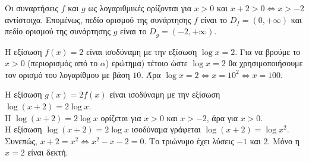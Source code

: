 \begin{alist}
\item Οι συναρτήσεις $f$ και $g$ ως λογαριθμικές ορίζονται για $x > 0$ και $x + 2 > 0 \Leftrightarrow x > -2$ αντίστοιχα. Επομένως, πεδίο ορισμού της συνάρτησης $f$ είναι το $D_f = (0, +\infty)$ και πεδίο ορισμού της συνάρτησης $g$ είναι το $D_g = (-2, +\infty)$.
\item 
\begin{rlist}
\item Η εξίσωση $f(x) = 2$ είναι ισοδύναμη με την εξίσωση $\log x = 2$. Για να βρούμε το $x>0$ (περιορισμός από το $\alpha$) ερώτημα) τέτοιο ώστε $\log x = 2$ θα χρησιμοποιήσουμε τον ορισμό του λογαρίθμου με βάση $10$. Άρα $\log x = 2 \Leftrightarrow x = 10^2 \Leftrightarrow x = 100$.
\item Η εξίσωση $g(x) = 2f(x)$ είναι ισοδύναμη με την εξίσωση $\log(x + 2) = 2\log x$. \\
Η $\log(x + 2) = 2\log x$ ορίζεται για $x > 0$ και $x > -2$, άρα για $x > 0$. \\
Η εξίσωση $\log(x + 2) = 2\log x$ ισοδύναμα γράφεται $\log(x + 2) = \log x^2$. Συνεπώς, $x + 2 = x^2 \Leftrightarrow x^2 - x - 2 = 0$. Το τριώνυμο έχει λύσεις $-1$ και $2$. Μόνο η $x=2$ είναι δεκτή.
\end{rlist}
\end{alist}

